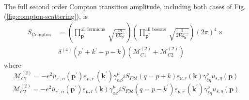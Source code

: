 \begin{qt}
    The full second order Compton transition amplitude, including both cases of Fig.(\ref{fig:compton-scattering}), is
    \begin{equation}
    \begin{split}
        S_{\text {Compton }}&=\left(\prod_{\mathbf{p}^{''}}^{\text {all fermions }} \sqrt{\frac{m}{V E_{\mathrm{p}^{''}}}}\right)\left(\prod_{\mathbf{p}^{''}}^{\text {all bosons }} \sqrt{\frac{1}{2 V \omega_{\mathbf{k}^{\prime\prime}}}}\right)(2 \pi)^{4}\times\\
        &\delta^{(4)}\left(p^{\prime}+k^{\prime}-p-k\right)\left(\mathcal{M}_{C 1}^{(2)}+\mathcal{M}_{C 2}^{(2)}\right)
    \end{split}
\end{equation}
where
$$
\mathcal{M}_{C 1}^{(2)}=-e^{2} \bar{u}_{s^{\prime}, \alpha}\left(\mathbf{p}^{\prime}\right) \varepsilon_{\mu, r^{\prime}}\left(\mathbf{k}^{\prime}\right) \gamma_{\alpha \beta}^{\mu} i S_{F \beta \delta}(q=p+k) \varepsilon_{\nu, r}(\mathbf{k}) \gamma_{\delta \eta}^{\nu} u_{s, \eta}(\mathbf{p})
$$
$$
\mathcal{M}_{C 2}^{(2)}=-e^{2} \bar{u}_{s^{\prime}, \alpha}\left(\mathbf{p}^{\prime}\right) \varepsilon_{\mu, r}(\mathbf{k}) \gamma_{\alpha \beta}^{\mu} i S_{F \beta \delta}\left(q=p-k^{\prime}\right) \varepsilon_{\nu, r^{\prime}}\left(\mathbf{k}^{\prime}\right) \gamma_{\delta \eta}^{\nu} u_{s, \eta}(\mathbf{p})
$$
\end{qt}
